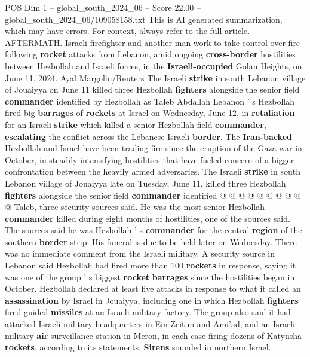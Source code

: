 \begin{textsample}{POS Dim 1 – global\_south\_2024\_06 – Score 22.00 – global\_south\_2024\_06/109058158.txt}  \label{ex:f1_pos_134}
This is AI generated summarization, which may have errors.
For context, always refer to the full article.
AFTERMATH.
Israeli firefighter and another man work to take control over fire following \textbf{rocket} attacks from Lebanon, amid ongoing \textbf{cross-border} hostilities between Hezbollah and Israeli forces, in the \textbf{Israeli-occupied} Golan Heights, on June 11, 2024.
Ayal Margolin/Reuters The Israeli \textbf{strike} in south Lebanon village of Jouaiyya on June 11 killed three Hezbollah \textbf{fighters} alongside the senior field \textbf{commander} identified by Hezbollah as Taleb Abdallah Lebanon ' s Hezbollah fired big \textbf{barrages} of \textbf{rockets} at Israel on Wednesday, June 12, in \textbf{retaliation} for an Israeli \textbf{strike} which killed a senior Hezbollah field \textbf{commander}, \textbf{escalating} the conflict across the Lebanese-Israeli \textbf{border}.
The \textbf{Iran-backed} Hezbollah and Israel have been trading fire since the eruption of the Gaza war in October, in steadily intensifying hostilities that have fueled concern of a bigger confrontation between the heavily armed adversaries.
The Israeli \textbf{strike} in south Lebanon village of Jouaiyya late on Tuesday, June 11, killed three Hezbollah \textbf{fighters} alongside the senior field \textbf{commander} identified @ @ @ @ @ @ @ @ @ @ Taleb, three security sources said.
He was the most senior Hezbollah \textbf{commander} killed during eight months of hostilities, one of the sources said.
The sources said he was Hezbollah ' s \textbf{commander} for the central \textbf{region} of the southern \textbf{border} strip.
His funeral is due to be held later on Wednesday.
There was no immediate comment from the Israeli military.
A security source in Lebanon said Hezbollah had fired more than 100 \textbf{rockets} in response, saying it was one of the group ' s biggest \textbf{rocket} \textbf{barrages} since the hostilities began in October.
Hezbollah declared at least five attacks in response to what it called an \textbf{assassination} by Israel in Jouaiyya, including one in which Hezbollah \textbf{fighters} fired guided \textbf{missiles} at an Israeli military factory.
The group also said it had attacked Israeli military headquarters in Ein Zeitim and Ami'ad, and an Israeli military \textbf{air} surveillance station in Meron, in each case firing dozens of Katyusha \textbf{rockets}, according to its statements. \textbf{Sirens} sounded in northern Israel.

\end{textsample}
